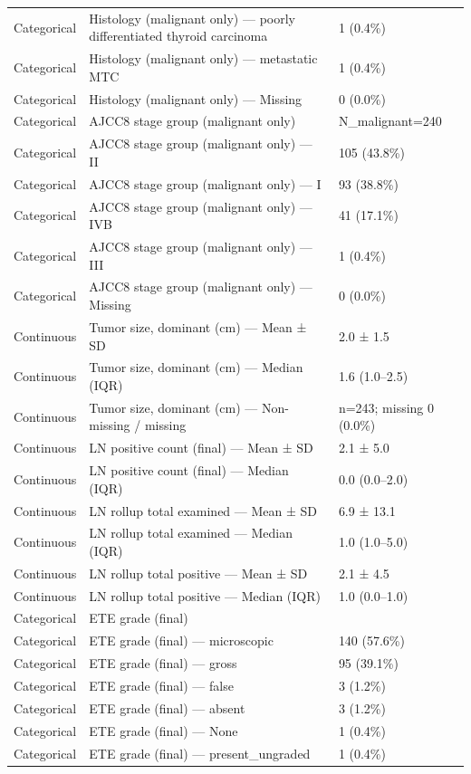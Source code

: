 \begin{table}[htbp]
\begin{tabular}{lll}
Categorical & Histology (malignant only) — poorly differentiated thyroid carcinoma & 1 (0.4\%) \\
Categorical & Histology (malignant only) — metastatic MTC & 1 (0.4\%) \\
Categorical & Histology (malignant only) — Missing & 0 (0.0\%) \\
Categorical & AJCC8 stage group (malignant only) & N\_malignant=240 \\
Categorical & AJCC8 stage group (malignant only) — II & 105 (43.8\%) \\
Categorical & AJCC8 stage group (malignant only) — I & 93 (38.8\%) \\
Categorical & AJCC8 stage group (malignant only) — IVB & 41 (17.1\%) \\
Categorical & AJCC8 stage group (malignant only) — III & 1 (0.4\%) \\
Categorical & AJCC8 stage group (malignant only) — Missing & 0 (0.0\%) \\
Continuous & Tumor size, dominant (cm) — Mean ± SD & 2.0 ± 1.5 \\
Continuous & Tumor size, dominant (cm) — Median (IQR) & 1.6 (1.0–2.5) \\
Continuous & Tumor size, dominant (cm) — Non-missing / missing & n=243; missing 0 (0.0\%) \\
Continuous & LN positive count (final) — Mean ± SD & 2.1 ± 5.0 \\
Continuous & LN positive count (final) — Median (IQR) & 0.0 (0.0–2.0) \\
Continuous & LN rollup total examined — Mean ± SD & 6.9 ± 13.1 \\
Continuous & LN rollup total examined — Median (IQR) & 1.0 (1.0–5.0) \\
Continuous & LN rollup total positive — Mean ± SD & 2.1 ± 4.5 \\
Continuous & LN rollup total positive — Median (IQR) & 1.0 (0.0–1.0) \\
Categorical & ETE grade (final) &  \\
Categorical & ETE grade (final) — microscopic & 140 (57.6\%) \\
Categorical & ETE grade (final) — gross & 95 (39.1\%) \\
Categorical & ETE grade (final) — false & 3 (1.2\%) \\
Categorical & ETE grade (final) — absent & 3 (1.2\%) \\
Categorical & ETE grade (final) — None & 1 (0.4\%) \\
Categorical & ETE grade (final) — present\_ungraded & 1 (0.4\%) \\

\end{tabular}
\end{table}
